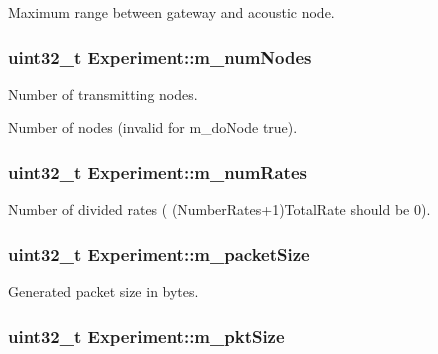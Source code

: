 Maximum range between gateway and acoustic node. 

\subsubsection[{\texorpdfstring{m\+\_\+num\+Nodes}{m_numNodes}}]{\setlength{\rightskip}{0pt plus 5cm}uint32\+\_\+t Experiment\+::m\+\_\+num\+Nodes}\hypertarget{classExperiment_ac22115998156e9cbf5a2112a1ec9b6bb}{}\label{classExperiment_ac22115998156e9cbf5a2112a1ec9b6bb}


Number of transmitting nodes. 

Number of nodes (invalid for m\+\_\+do\+Node true). 
\subsubsection[{\texorpdfstring{m\+\_\+num\+Rates}{m_numRates}}]{\setlength{\rightskip}{0pt plus 5cm}uint32\+\_\+t Experiment\+::m\+\_\+num\+Rates}\hypertarget{classExperiment_abdde6720121e71224882f7b87536d6ff}{}\label{classExperiment_abdde6720121e71224882f7b87536d6ff}


Number of divided rates ( (Number\+Rates+1)Total\+Rate should be 0). 

\subsubsection[{\texorpdfstring{m\+\_\+packet\+Size}{m_packetSize}}]{\setlength{\rightskip}{0pt plus 5cm}uint32\+\_\+t Experiment\+::m\+\_\+packet\+Size}\hypertarget{classExperiment_a1562acfc7bc2cbd4c5f995b7c4ef01d0}{}\label{classExperiment_a1562acfc7bc2cbd4c5f995b7c4ef01d0}


Generated packet size in bytes. 

\subsubsection[{\texorpdfstring{m\+\_\+pkt\+Size}{m_pktSize}}]{\setlength{\rightskip}{0pt plus 5cm}uint32\+\_\+t Experiment\+::m\+\_\+pkt\+Size}\hypertarget{classExperiment_ae73c947a54c222644fecfefd6d70b5a4}{}\label{classExperiment_ae73c947a54c222644fecfefd6d70b5a4}



